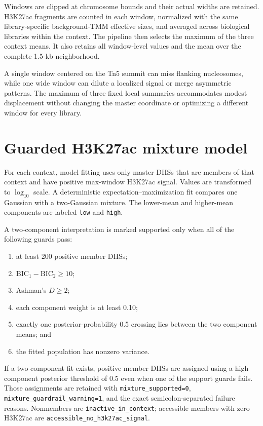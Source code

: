 \documentclass[11pt]{article}
\begin{document}
Windows are clipped at chromosome bounds and their actual widths are retained.
H3K27ac fragments are counted in each window, normalized with the same
library-specific background-TMM effective sizes, and averaged across
biological libraries within the context.  The pipeline then selects the
maximum of the three context means.  It also retains all window-level values
and the mean over the complete 1.5-kb neighborhood.

A single window centered on the Tn5 summit can miss flanking nucleosomes, while
one wide window can dilute a localized signal or merge asymmetric patterns.
The maximum of three fixed local summaries accommodates modest displacement
without changing the master coordinate or optimizing a different window for
every library.

\section{Guarded H3K27ac mixture model}

For each context, model fitting uses only master DHSs that are members of that
context and have positive max-window H3K27ac signal.  Values are transformed
to \(\log_{10}\) scale.  A deterministic expectation--maximization fit compares
one Gaussian with a two-Gaussian mixture.  The lower-mean and higher-mean
components are labeled \texttt{low} and \texttt{high}.

A two-component interpretation is marked supported only when all of the
following guards pass:

\begin{enumerate}
  \item at least 200 positive member DHSs;
  \item \(\mathrm{BIC}_{1}-\mathrm{BIC}_{2} \geq 10\);
  \item Ashman's \(D\geq2\);
  \item each component weight is at least 0.10;
  \item exactly one posterior-probability 0.5 crossing lies between the two
  component means; and
  \item the fitted population has nonzero variance.
\end{enumerate}

If a two-component fit exists, positive member DHSs are assigned using a high
component posterior threshold of 0.5 even when one of the support guards
fails.  Those assignments are retained with
\texttt{mixture\_supported=0},
\texttt{mixture\_guardrail\_warning=1}, and the exact semicolon-separated
failure reasons.  Nonmembers are \texttt{inactive\_in\_context}; accessible
members with zero H3K27ac are
\texttt{accessible\_no\_h3k27ac\_signal}.
\end{document}
